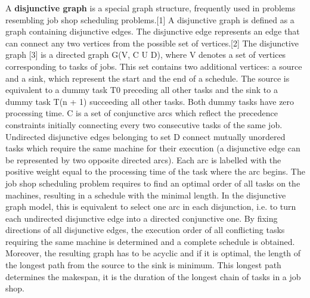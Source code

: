 \documentclass[a4paper,10pt]{article}
\begin{document}
A \textbf{disjunctive graph} is a special graph structure, frequently used in problems resembling job shop scheduling problems.[1] A disjunctive graph is defined as a graph containing disjunctive edges. The disjunctive edge represents an edge that can connect any two vertices from the possible set of vertices.[2]
The disjunctive graph [3] is a directed graph G(V, C U D), where V denotes a set of vertices corresponding to tasks of jobs. This set contains two additional vertices: a source and a sink, which represent the start and the end of a schedule. The source is equivalent to a dummy task T0 preceding all other tasks and the sink to a dummy task T(n + 1) succeeding all other tasks. Both dummy tasks have zero processing time. C is a set of conjunctive arcs which reflect the precedence constraints initially connecting every two consecutive tasks of the same job. Undirected disjunctive edges belonging to set D connect mutually unordered tasks which require the same machine for their execution (a disjunctive edge can be represented by two opposite directed arcs). Each arc is labelled with the positive weight equal to the processing time of the task where the arc begins.
The job shop scheduling problem requires to find an optimal order of all tasks on the machines, resulting in a schedule with the minimal length. In the disjunctive graph model, this is equivalent to select one arc in each disjunction, i.e. to turn each undirected disjunctive edge into a directed conjunctive one. By fixing directions of all disjunctive edges, the execution order of all conflicting tasks requiring the same machine is determined and a complete schedule is obtained. Moreover, the resulting graph has to be acyclic and if it is optimal, the length of the longest path from the source to the sink is minimum. This longest path determines the makespan, it is the duration of the longest chain of tasks in a job shop.
\end{document}
